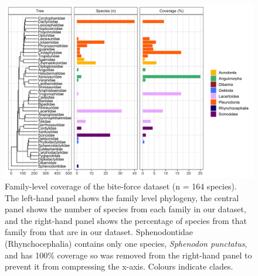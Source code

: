 \documentclass[a4paper, 12pt]{article}
\begin{document}
\begin{figure}[h]
 \centering
  \includegraphics[width = \linewidth]{figures/phylogeny-data-coverage-colours.png}
  \caption{Family-level coverage of the bite-force dataset (n = 164 species). 
  The left-hand panel shows the family level phylogeny, the central panel shows the number of species from each family in our dataset, and the right-hand panel shows the percentage of species from that family from \cite{uetz2020reptile} that are in our dataset. 
  Sphenodontidae (Rhynchocephalia) contains only one species, \textit{Sphenodon punctatus}, and has 100\% coverage so was removed from the right-hand panel to prevent it from compressing the x-axis. 
  Colours indicate clades.
}
  \label{fig-data-coverage}
\end{figure}
\end{document}
